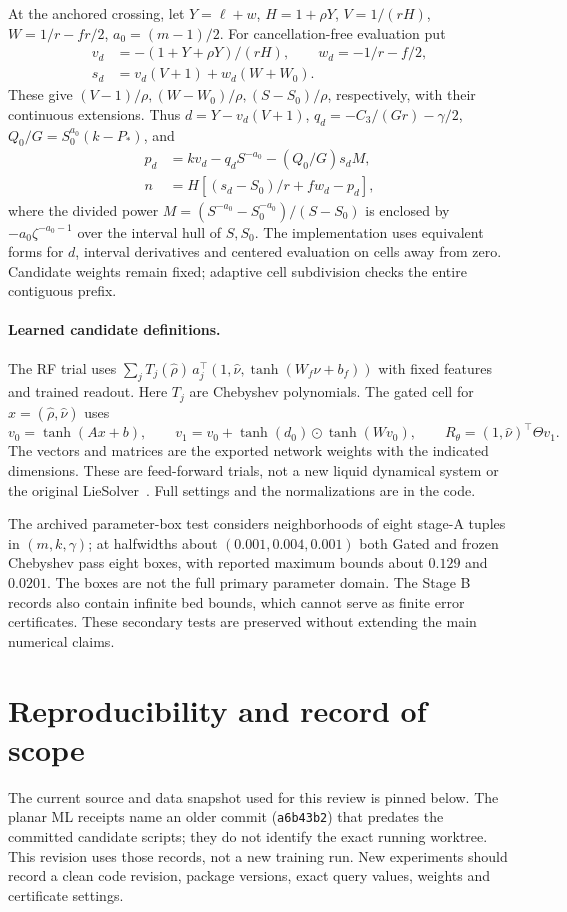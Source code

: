 \documentclass[12pt,a4paper,oneside]{report}
\numberwithin{equation}{chapter}
\theoremstyle{definition}
\theoremstyle{remark}\newtheorem{remark}[theorem]{Remark}
\DeclareRobustCommand{\code}[1]{\nolinkurl{#1}}
\newif\ifreviewmarks
\DeclareRobustCommand{\review}[1]{{\ifreviewmarks\color{authorblue}\fi #1}}
\begin{document}
At the anchored crossing, let $Y=\ell+w$, $H=1+\rho Y$, $V=1/(rH)$, $W=1/r-fr/2$, $a_0=(m-1)/2$. For cancellation-free evaluation put
\[
 \begin{aligned}
 v_d&=-(1+Y+\rho Y)/(rH),\qquad w_d=-1/r-f/2,\\
 s_d&=v_d(V+1)+w_d(W+W_0).
 \end{aligned}
\]
These give $(V-1)/\rho,(W-W_0)/\rho,(S-S_0)/\rho$, respectively, with their continuous extensions. Thus $d=Y-v_d(V+1)$, $q_d=-C_3/(Gr)-\gamma/2$, $Q_0/G=S_0^{a_0}(k-P_*)$, and
\[
 \begin{aligned}
 p_d&=kv_d-q_d S^{-a_0}-(Q_0/G)s_d M,\\
 n&=H[(s_d-S_0)/r+fw_d-p_d],
 \end{aligned}
\]
where the divided power $M=(S^{-a_0}-S_0^{-a_0})/(S-S_0)$ is enclosed by $-a_0\zeta^{-a_0-1}$ over the interval hull of $S,S_0$. The implementation uses equivalent forms for $d$, interval derivatives and centered evaluation on cells away from zero. Candidate weights remain fixed; adaptive cell subdivision checks the entire contiguous prefix.

\paragraph{Learned candidate definitions.}
The RF trial uses $\sum_j T_j(\widehat\rho)\,a_j^\top(1,\widehat\nu,\tanh(W_f\widehat\nu+b_f))$ with fixed features and trained readout. Here $T_j$ are Chebyshev polynomials. The gated cell for $x=(\widehat\rho,\widehat\nu)$ uses
\[
 v_0=\tanh(Ax+b),\qquad
 v_1=v_0+\tanh(d_0)\odot\tanh(Wv_0),\qquad
 R_\theta=(1,\widehat\nu)^\top\Theta v_1 .
\]
The vectors and matrices are the exported network weights with the indicated dimensions. These are feed-forward trials, not a new liquid dynamical system or the original LieSolver~\cite{klausen2026}. Full settings and the normalizations are in the code.

\review{The archived parameter-box test considers neighborhoods of eight stage-A tuples in $(m,k,\gamma)$; at halfwidths about $(0.001,0.004,0.001)$ both Gated and frozen Chebyshev pass eight boxes, with reported maximum bounds about $0.129$ and $0.0201$. The boxes are not the full primary parameter domain. The Stage B records also contain infinite bed bounds, which cannot serve as finite error certificates. These secondary tests are preserved without extending the main numerical claims.}

\section{Reproducibility and record of scope}\label{app:reproducibility}
\review{The current source and data snapshot used for this review is pinned below. The planar ML receipts name an older commit (\code{a6b43b2}) that predates the committed candidate scripts; they do not identify the exact running worktree. This revision uses those records, not a new training run. New experiments should record a clean code revision, package versions, exact query values, weights and certificate settings.}
\end{document}
